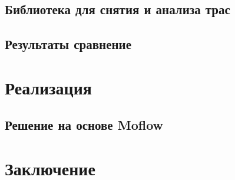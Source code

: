 \section{Библиотека для снятия и анализа трас}

\section{Результаты сравнение}


\chapter{Реализация}


\section{Решение на основе Moflow}

\chapter{Заключение}





